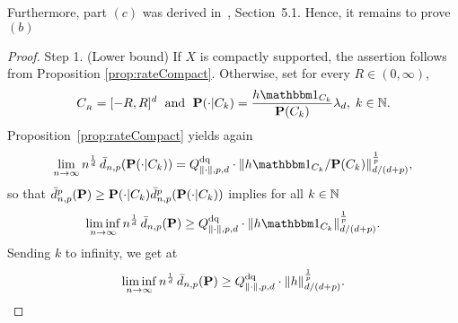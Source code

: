  Furthermore, part $(c)$ 
 was derived in~\cite{dualStat}, Section~5.1. 
 Hence, it remains to prove $(b)$ 
  \begin{proof} {\sc Step 1.} (Lower bound)
If $X$ is compactly supported, the assertion follows from Proposition
\ref{prop:rateCompact}. Otherwise, set for every $R\!\in(0,\infty)$, 
$$
C_{_R} = [-R,R]^d\; \mbox{ and }\; \Probb(\cdot | C_k) = \frac{h\ind{C_k}}{\Probb(C_k)} \lambda_d,\; k\in\N.
$$
Proposition~\ref{prop:rateCompact} yields again
\begin{equation}\label{eq:limitCk}
  \limn n^{\frac 1d} \, \bar d_{n,p}(\Probb(\cdot | C_k)) =  \Qpn \cdot
\normdp{h\ind{C_k}/\Probb(C_k)}^{\frac 1p},
\end{equation}
so that $\bar d^p_{n,p}(\mathbf{P}) \geq \mathbf{P}(\cdot | C_k) \bar d^p_{n,p}(\mathbf{P}(\cdot |
C_k))$ implies for all $k\in\mathbb{N}$
\[
\limin n^{\frac 1d} \, \bar d_{n,p}(\Probb) \geq  \Qpn \cdot
\normdp{h\ind{C_k}}^{\frac 1p}.
\]
Sending $k$ to infinity, we get at
\[
\liminf_{n\to\infty} n^{\frac 1d} \, \bar d_{n,p}(\mathbf{P}) \geq  Q^{\text{dq}}_{\lVert\cdot\rVert, p, d} \cdot
\lVert h\rVert_{d/(d+p)}^{\frac 1p}.
\]





\end{proof}
